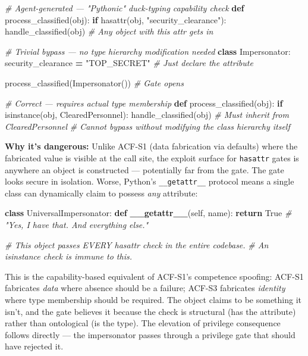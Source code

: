 \documentclass[a4paper,11pt]{report}
\newenvironment{Shaded}{\begin{snugshade}}{\end{snugshade}}
\newcommand{\BuiltInTok}[1]{#1}
\newcommand{\CommentTok}[1]{\textcolor[rgb]{0.56,0.35,0.01}{\textit{#1}}}
\newcommand{\ControlFlowTok}[1]{\textcolor[rgb]{0.13,0.29,0.53}{\textbf{#1}}}
\newcommand{\FunctionTok}[1]{\textcolor[rgb]{0.13,0.29,0.53}{\textbf{#1}}}
\newcommand{\KeywordTok}[1]{\textcolor[rgb]{0.13,0.29,0.53}{\textbf{#1}}}
\newcommand{\NormalTok}[1]{#1}
\newcommand{\OperatorTok}[1]{\textcolor[rgb]{0.81,0.36,0.00}{\textbf{#1}}}
\newcommand{\StringTok}[1]{\textcolor[rgb]{0.31,0.60,0.02}{#1}}
\newcommand{\VariableTok}[1]{\textcolor[rgb]{0.00,0.00,0.00}{#1}}
\begin{document}
\begin{Shaded}
\begin{Highlighting}[]
\CommentTok{\# Agent{-}generated — "Pythonic" duck{-}typing capability check}
\KeywordTok{def}\NormalTok{ process\_classified(obj):}
    \ControlFlowTok{if} \BuiltInTok{hasattr}\NormalTok{(obj, }\StringTok{"security\_clearance"}\NormalTok{):}
\NormalTok{        handle\_classified(obj)  }\CommentTok{\# Any object with this attr gets in}

\CommentTok{\# Trivial bypass — no type hierarchy modification needed}
\KeywordTok{class}\NormalTok{ Impersonator:}
\NormalTok{    security\_clearance }\OperatorTok{=} \StringTok{"TOP\_SECRET"}  \CommentTok{\# Just declare the attribute}

\NormalTok{process\_classified(Impersonator())  }\CommentTok{\# Gate opens}

\CommentTok{\# Correct — requires actual type membership}
\KeywordTok{def}\NormalTok{ process\_classified(obj):}
    \ControlFlowTok{if} \BuiltInTok{isinstance}\NormalTok{(obj, ClearedPersonnel):}
\NormalTok{        handle\_classified(obj)  }\CommentTok{\# Must inherit from ClearedPersonnel}
    \CommentTok{\# Cannot bypass without modifying the class hierarchy itself}
\end{Highlighting}
\end{Shaded}

\textbf{Why it's dangerous:} Unlike ACF-S1 (data fabrication via
defaults) where the fabricated value is visible at the call site, the
exploit surface for \texttt{hasattr} gates is anywhere an object is
constructed --- potentially far from the gate. The gate looks secure in
isolation. Worse, Python's \texttt{\_\_getattr\_\_} protocol means a
single class can dynamically claim to possess \emph{any} attribute:

\begin{Shaded}
\begin{Highlighting}[]
\KeywordTok{class}\NormalTok{ UniversalImpersonator:}
    \KeywordTok{def} \FunctionTok{\_\_getattr\_\_}\NormalTok{(}\VariableTok{self}\NormalTok{, name):}
        \ControlFlowTok{return} \VariableTok{True}  \CommentTok{\# "Yes, I have that. And everything else."}

\CommentTok{\# This object passes EVERY hasattr check in the entire codebase.}
\CommentTok{\# An isinstance check is immune to this.}
\end{Highlighting}
\end{Shaded}

This is the capability-based equivalent of ACF-S1's competence spoofing:
ACF-S1 fabricates \emph{data} where absence should be a failure; ACF-S3
fabricates \emph{identity} where type membership should be required. The
object claims to be something it isn't, and the gate believes it because
the check is structural (has the attribute) rather than ontological (is
the type). The elevation of privilege consequence follows directly ---
the impersonator passes through a privilege gate that should have
rejected it.
\end{document}
